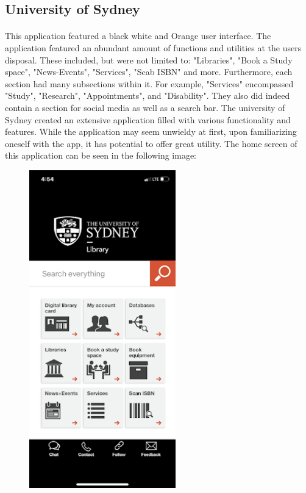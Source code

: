         \subsection{University of Sydney}
            \paragraph{}
            This application featured a black white and Orange user interface. The application featured an abundant amount of functions and utilities at the users disposal. These included, but were not limited to: "Libraries", "Book a Study space", "News-Events", "Services", "Scab ISBN" and more. Furthermore, each section had many subsections within it. For example, "Services" encompassed "Study", "Research", "Appointments", and "Disability". They also did indeed contain a section for social media as well as a search bar. The university of Sydney created an extensive application filled with various functionality and features. While the application may seem unwieldy at first, upon familiarizing oneself with the app, it has potential to offer great utility.  
            The home screen of this application can be seen in the following image: 
            \begin{figure}[htbp]
            \centerline{\includegraphics[width=2.5in]{unnamed.png}}
            \end{figure}
